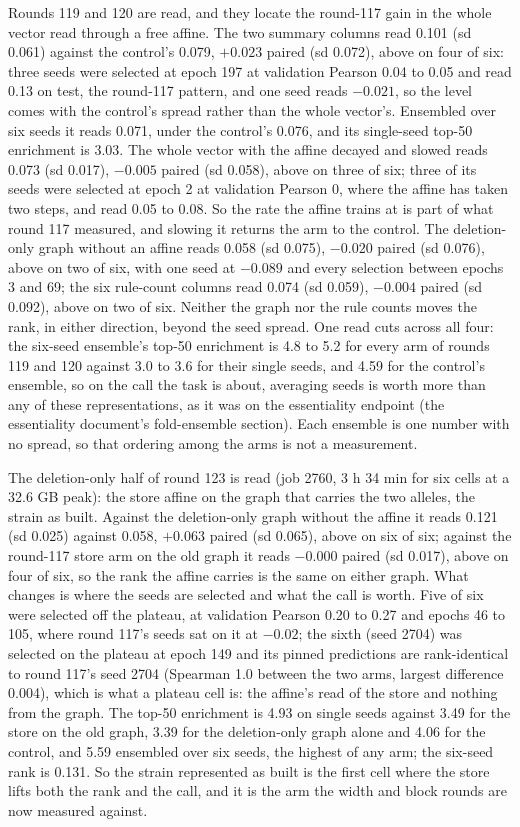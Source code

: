 Rounds 119 and 120 are read, and they locate the round-117 gain in the whole vector
read through a free affine. The two summary columns read 0.101 (sd 0.061) against the
control's 0.079, $+0.023$ paired (sd 0.072), above on four of six: three seeds were
selected at epoch 197 at validation Pearson 0.04 to 0.05 and read 0.13 on test, the
round-117 pattern, and one seed reads $-0.021$, so the level comes with the control's
spread rather than the whole vector's. Ensembled over six seeds it reads 0.071, under the
control's 0.076, and its single-seed top-50 enrichment is 3.03. The whole vector with the
affine decayed and slowed reads 0.073 (sd 0.017), $-0.005$ paired (sd 0.058), above on
three of six; three of its seeds were selected at epoch 2 at validation Pearson 0, where
the affine has taken two steps, and read 0.05 to 0.08. So the rate the affine trains at
is part of what round 117 measured, and slowing it returns the arm to the control. The
deletion-only graph without an affine reads 0.058 (sd 0.075), $-0.020$ paired (sd
0.076), above on two of six, with one seed at $-0.089$ and every selection between
epochs 3 and 69; the six rule-count columns read 0.074 (sd 0.059), $-0.004$ paired (sd
0.092), above on two of six. Neither the graph nor the rule counts moves the rank, in
either direction, beyond the seed spread. One read cuts across all four: the six-seed
ensemble's top-50 enrichment is 4.8 to 5.2 for every arm of rounds 119 and 120 against
3.0 to 3.6 for their single seeds, and 4.59 for the control's ensemble, so on the call
the task is about, averaging seeds is worth more than any of these representations, as
it was on the essentiality endpoint (the essentiality document's fold-ensemble section). Each ensemble is one
number with no spread, so that ordering among the arms is not a measurement.

The deletion-only half of round 123 is read (job 2760, 3 h 34 min for six cells at a
32.6 GB peak): the store affine on the graph that carries the two alleles, the strain as
built. Against the deletion-only graph without the affine it reads 0.121 (sd 0.025)
against 0.058, $+0.063$ paired (sd 0.065), above on six of six; against the round-117
store arm on the old graph it reads $-0.000$ paired (sd 0.017), above on four of six, so
the rank the affine carries is the same on either graph. What changes is where the
seeds are selected and what the call is worth. Five of six were selected off the
plateau, at validation Pearson 0.20 to 0.27 and epochs 46 to 105, where round 117's
seeds sat on it at $-0.02$; the sixth (seed 2704) was selected on the plateau at epoch
149 and its pinned predictions are rank-identical to round 117's seed 2704 (Spearman 1.0
between the two arms, largest difference 0.004), which is what a plateau cell is: the
affine's read of the store and nothing from the graph. The top-50 enrichment is 4.93 on
single seeds against 3.49 for the store on the old graph, 3.39 for the deletion-only
graph alone and 4.06 for the control, and 5.59 ensembled over six seeds, the highest of
any arm; the six-seed rank is 0.131. So the strain represented as built is the first
cell where the store lifts both the rank and the call, and it is the arm the width and
block rounds are now measured against.

